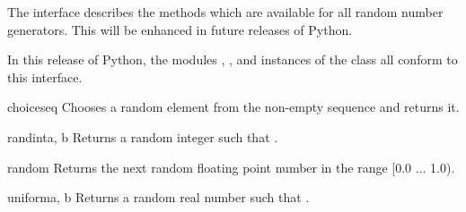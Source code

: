 
The  interface describes the methods
which are available for all random number generators.  This will be
enhanced in future releases of Python.

In this release of Python, the modules ,
, and instances of the
 class all conform to this interface.


\begin{funcdesc}{choice}{seq}
Chooses a random element from the non-empty sequence  and
returns it.
\end{funcdesc}

\begin{funcdesc}{randint}{a, b}
Returns a random integer  such that
.
\end{funcdesc}

\begin{funcdesc}{random}{}
Returns the next random floating point number in the range [0.0
... 1.0).
\end{funcdesc}

\begin{funcdesc}{uniform}{a, b}
Returns a random real number  such that
.
\end{funcdesc}
